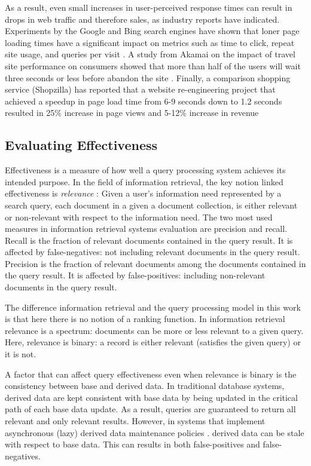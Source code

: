 As a result, even small increases in user-perceived response times can result in drops in web traffic and
therefore sales, as industry reports have indicated.
Experiments by the Google and Bing search engines have shown that loner page loading times have a significant impact on
metrics such as time to click, repeat site usage, and queries per visit \cite{schurman:rerformanceuserimpact}.
A study from Akamai on the impact of travel site performance on consumers showed that more than half of the users will
wait three seconds or less before abandon the site \cite{akamai:travelsiteperformance}.
Finally, a comparison shopping service (Shopzilla) has reported that a website re-engineering project that achieved a
speedup in page load time from 6-9 seconds down to 1.2 seconds resulted in 25\% increase in page views and 5-12\%
increase in revenue \cite{dixon:shopzillasiteredo}

\subsection{Evaluating Effectiveness}

Effectiveness is a measure of how well a query processing system achieves its intended purpose.
In the field of information retrieval, the key notion linked effectiveness is \textit{relevance}
\cite{buttcher:informationretrieval}:
Given a user's information need represented by a search query, each document in a given a document collection, is either
relevant or non-relevant with respect to the information need.
The two most used measures in information retrieval systems evaluation are precision and recall.
Recall is the fraction of relevant documents contained in the query result.
It is affected by false-negatives: not including relevant documents in the query result.
Precision is the fraction of relevant documents among the documents contained in the query result.
It is affected by false-positives: including non-relevant documents in the query result.

The difference information retrieval and the query processing model in this work is that here there is no notion of a
ranking function.
In information retrieval relevance is a spectrum: documents can be more or less relevant to a given query.
Here, relevance is binary: a record is either relevant (satisfies the given query) or it is not.


A factor that can affect query effectiveness even when relevance is binary is the consistency between base
and derived data.
In traditional database systems, derived data are kept consistent with base data by being updated in the critical path
of each base data update.
As a result, queries are guaranteed to return all relevant and only relevant results.
However, in systems that implement asynchronous (lazy) derived data maintenance policies \cite{tan:diffindex,
qi:secondaryindexconsistencyanalysis, shukla:schemaagnostic}. derived data can be stale with respect to base data.
This can results in both false-positives and false-negatives.

